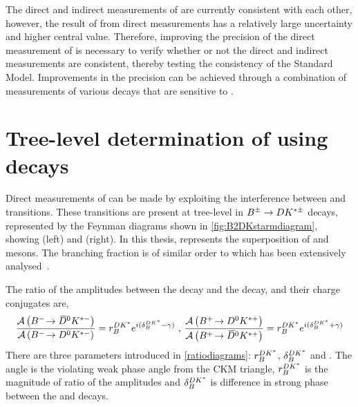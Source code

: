 The direct and indirect measurements of \Pgamma are currently consistent with each other, however, the result of \Pgamma from direct measurements has a relatively large uncertainty and higher central value. Therefore, improving the precision of the direct measurement of \Pgamma is necessary to verify whether or not the direct and indirect measurements are consistent, thereby testing the consistency of the Standard Model. Improvements in the precision can be achieved through a combination of measurements of various \B decays that are sensitive to \Pgamma.

\section{Tree-level determination of \Pgamma using  decays}
\label{sec:theory:gamma}

Direct measurements of \Pgamma can be made by exploiting the interference between \decay{\bquark}{\cquark\uquarkbar\squark} and \decay{\bquark}{\uquark\cquarkbar\squark} transitions. These transitions are present at tree-level in ${{B}^\pm} \rightarrow {\ensuremath{D}}{\ensuremath{K}}^{*\pm}$ decays, represented by the Feynman diagrams shown in \fig\ref{fig:B2DKstarmdiagram}, showing \decay{\Bm}{\Dz\Kstarm} (left) and \decay{\Bm}{\Dzb\Kstarm} (right). In this thesis, \D represents the superposition of \Dz and \Dzb mesons. The branching
fraction is of similar order to \decay{\Bm}{\Dzb\Km} which has been extensively analysed~\cite{LHCb-PAPER-2016-003,LHCb-PAPER-2014-041,LHCb-PAPER-2015-014}.


The ratio of the amplitudes between the \decay{\Bm}{\Dzb\Kstarm} decay and the \decay{\Bm}{\Dz\Kstarm} decay, and their charge conjugates are,
\begin{equation}
\frac{\mathcal{A}\left({{{B}^-}}\!\rightarrow {\ensuremath{{\kern 0.2em\overline{\kern -0.2em D}{}}{}^0}}{\ensuremath{{K}^{*-}}}\right)}{\mathcal{A}\left({{{B}^-}}\!\rightarrow {\ensuremath{{D}^0}}{\ensuremath{{K}^{*-}}}\right)} = r_B^{DK^*} e^{i(\delta_B^{DK^*} - \gamma)} \text{ , }
\frac{\mathcal{A}\left({{{B}^+}}\!\rightarrow {\ensuremath{{D}^0}}{\ensuremath{{K}^{*+}}}\right)}{\mathcal{A}\left({{{B}^+}}\!\rightarrow {\ensuremath{{\kern 0.2em\overline{\kern -0.2em D}{}}{}^0}}{\ensuremath{{K}^{*+}}}\right)} = r_B^{DK^*} e^{i(\delta_B^{DK^*} + \gamma)}
\label{ratiodiagrams}
\end{equation}
There are three parameters introduced in \eqn\ref{ratiodiagrams}: $r_B^{DK^*}$, $\delta_B^{DK^*}$ and \Pgamma. The angle \Pgamma is the \CP violating weak phase angle from the CKM triangle, $r_B^{DK^*}$ is the magnitude of ratio of the amplitudes and $\delta_B^{DK^*}$ is difference in strong phase between the \decay{\Bm}{\Dz\Kstarm} and \decay{\Bm}{\Dzb\Kstarm} decays.

